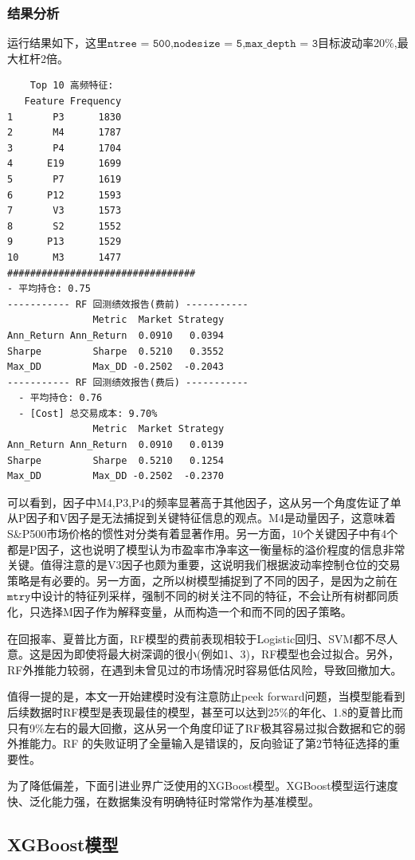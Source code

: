 \documentclass[11pt, a4paper]{article}
\begin{document}
\subsubsection{结果分析}
运行结果如下，这里$\texttt{ntree      = 500,nodesize   = 5,max\_depth  = 3}$目标波动率20\%,最大杠杆2倍。
\begin{verbatim}
    Top 10 高频特征:
   Feature Frequency
1       P3      1830
2       M4      1787
3       P4      1704
4      E19      1699
5       P7      1619
6      P12      1593
7       V3      1573
8       S2      1552
9      P13      1529
10      M3      1477
#################################
- 平均持仓: 0.75 
----------- RF 回测绩效报告(费前) -----------
               Metric  Market Strategy
Ann_Return Ann_Return  0.0910   0.0394
Sharpe         Sharpe  0.5210   0.3552
Max_DD         Max_DD -0.2502  -0.2043
----------- RF 回测绩效报告(费后) ----------- 
  - 平均持仓: 0.76
  - [Cost] 总交易成本: 9.70%    
               Metric  Market Strategy        
Ann_Return Ann_Return  0.0910   0.0139        
Sharpe         Sharpe  0.5210   0.1254        
Max_DD         Max_DD -0.2502  -0.2370
\end{verbatim}
可以看到，因子中M4,P3,P4的频率显著高于其他因子，这从另一个角度佐证了单从P因子和V因子是无法捕捉到关键特征信息的观点。M4是动量因子，这意味着S\&P500市场价格的惯性对分类有着显著作用。另一方面，10个关键因子中有4个都是P因子，这也说明了模型认为市盈率市净率这一衡量标的溢价程度的信息非常关键。值得注意的是V3因子也颇为重要，这说明我们根据波动率控制仓位的交易策略是有必要的。另一方面，之所以树模型捕捉到了不同的因子，是因为之前在$\texttt{mtry}$中设计的特征列采样，强制不同的树关注不同的特征，不会让所有树都同质化，只选择M因子作为解释变量，从而构造一个和而不同的因子策略。

在回报率、夏普比方面，RF模型的费前表现相较于Logistic回归、SVM都不尽人意。这是因为即使将最大树深调的很小(例如1、3)，RF模型也会过拟合。另外，RF外推能力较弱，在遇到未曾见过的市场情况时容易低估风险，导致回撤加大。

值得一提的是，本文一开始建模时没有注意防止peek forward问题，当模型能看到后续数据时RF模型是表现最佳的模型，甚至可以达到25\%的年化、1.8的夏普比而只有9\%左右的最大回撤，这从另一个角度印证了RF极其容易过拟合数据和它的弱外推能力。RF 的失败证明了全量输入是错误的，反向验证了第2节特征选择的重要性。

为了降低偏差，下面引进业界广泛使用的XGBoost模型。XGBoost模型运行速度快、泛化能力强，在数据集没有明确特征时常常作为基准模型。
\subsection{XGBoost模型}
\end{document}
